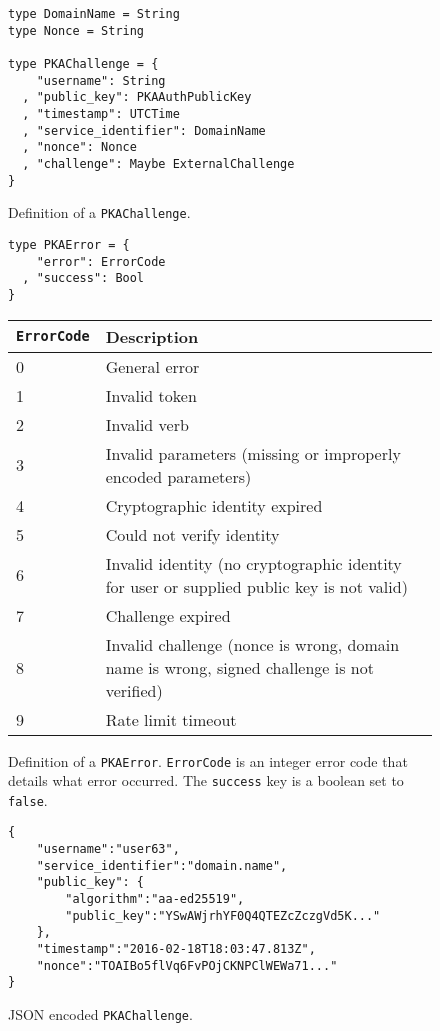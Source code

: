 \documentclass{article}
\newcommand{\todo}[1]{\textcolor{red}{#1}}
\begin{document}
\begin{figure}
\begin{lstlisting}
type DomainName = String
type Nonce = String

type PKAChallenge = {
    "username": String
  , "public_key": PKAAuthPublicKey
  , "timestamp": UTCTime
  , "service_identifier": DomainName
  , "nonce": Nonce
  , "challenge": Maybe ExternalChallenge
}
\end{lstlisting}
\caption{Definition of a \texttt{PKAChallenge}.}
\label{code:pkachallenge}
\end{figure}

\begin{figure}
\begin{lstlisting}
type PKAError = {
    "error": ErrorCode
  , "success": Bool
}
\end{lstlisting}
\begin{tabular}{| l | p{14cm} |}
\hline
\texttt{ErrorCode} & Description \\
\hline
0 & General error \\
1 & Invalid token \\
2 & Invalid verb \\
3 & Invalid parameters (missing or improperly encoded parameters) \\
4 & Cryptographic identity expired \\
5 & Could not verify identity \\
6 & Invalid identity (no cryptographic identity for user or supplied public key is not valid) \\
7 & Challenge expired \\
8 & Invalid challenge (nonce is wrong, domain name is wrong, signed challenge is not verified) \\
9 & Rate limit timeout \\
\hline
\end{tabular}
\caption{Definition of a \texttt{PKAError}. \texttt{ErrorCode} is an integer error code that details what error occurred. The \texttt{success} key is a boolean set to \texttt{false}.}
\label{code:pkaerror}
\end{figure}





\begin{figure}
\begin{lstlisting}
{
    "username":"user63",
    "service_identifier":"domain.name",
    "public_key": {
        "algorithm":"aa-ed25519",
        "public_key":"YSwAWjrhYF0Q4QTEZcZczgVd5K..."
    },
    "timestamp":"2016-02-18T18:03:47.813Z",
    "nonce":"TOAIBo5flVq6FvPOjCKNPClWEWa71..."
}
\end{lstlisting}
\caption{JSON encoded \texttt{PKAChallenge}.}
\label{code:pkachallengejson}
\end{figure}
\end{document}
